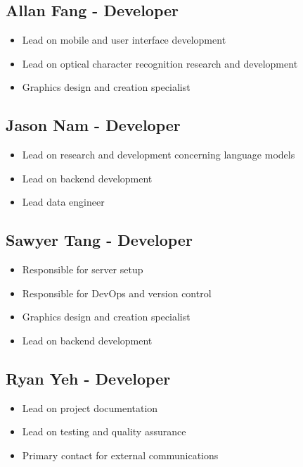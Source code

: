 \documentclass{article}
\begin{document}
	\subsection{Allan Fang - Developer}
        \begin{itemize}
            \item Lead on mobile and user interface development
            \item Lead on optical character recognition research and development
            \item Graphics design and creation specialist
        \end{itemize}
    \subsection{Jason Nam - Developer}
        \begin{itemize}
            \item Lead on research and development concerning language models
            \item Lead on backend development
            \item Lead data engineer
        \end{itemize}
    \subsection{Sawyer Tang - Developer}
        \begin{itemize}
            \item Responsible for server setup
            \item Responsible for DevOps and version control
            \item Graphics design and creation specialist
            \item Lead on backend development
        \end{itemize}
    \subsection{Ryan Yeh - Developer}
        \begin{itemize}
            \item Lead on project documentation
            \item Lead on testing and quality assurance
            \item Primary contact for external communications
        \end{itemize}
\end{document}
